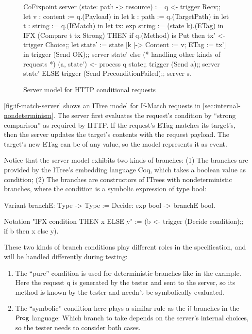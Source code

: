 \begin{figure}
\begin{coq}
  CoFixpoint server (state: path -> resource) :=
    q <- trigger Recv;;
    let v : content    := q.(Payload)      in
    let k : path       := q.(TargetPath)   in
    let t : string     := q.(IfMatch)      in
    let tx: exp string := (state k).(ETag) in
    IFX (Compare t tx Strong)
    THEN
      if q.(Method) is Put
      then
        tx' <- trigger Choice;;
        let state' := state [k |-> {Content := v; ETag := tx'}] in
        trigger (Send OK);;
        server state'
      else                 (* handling other kinds of requests *)
        (a, state') <- process q state;;
        trigger (Send a);;
        server state'
    ELSE
      trigger (Send PreconditionFailed);;
      server s.
\end{coq}
\caption{Server model for HTTP conditional requests}
\label{fig:if-match-server}
\end{figure}

\autoref{fig:if-match-server} shows an ITree model for If-Match requests in
\autoref{sec:internal-nondeterminism}.  The server first evaluates the request's
 condition by ``strong comparison'' as required by HTTP.  If
the request's ETag matches its target's, then the server updates the target's
contents with the request payload.  The target's new ETag  can be of
any value, so the model represents it as  event.

Notice that the server model exhibits two kinds of branches: (1) The 
branches are provided by the ITree's embedding language Coq, which takes a
boolean value as condition; (2) The  branches are constructors of
ITrees with nondeterministic branches, where the condition is a symbolic
expression of type bool:
\begin{coq}
  Variant branchE: Type -> Type :=
    Decide: exp bool -> branchE bool.

  Notation "IFX condition THEN x ELSE y" :=
    (b <- trigger (Decide condition);;
     if b then x else y).
\end{coq}

These two kinds of branch conditions play different roles in the specification,
and will be handled differently during testing:
\begin{enumerate}
\item The ``pure''  condition is used for deterministic branches like
   in the example.  Here the request \ilc q is
  generated by the tester and sent to the server, so its method is known by the
  tester and needn't be symbolically evaluated.
\item The ``symbolic''  condition here plays a similar rule as the
  $\mathsf{if}$ branches in the $\mathsf{Prog}$ language: Which branch to take depends
  on the server's internal choices, so the tester needs to consider both cases.
\end{enumerate}

